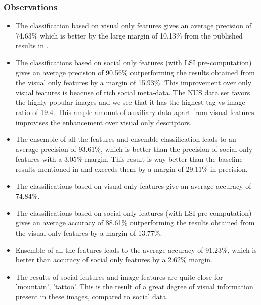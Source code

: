 \subsubsection*{Observations}
\begin{itemize}
\item The classification based on visual only features gives an  average precision of 74.63\% which is better by the large margin 
of 10.13\% from the published results in \citet*{NUS}.
\item The classifications based on social only features (with LSI pre-computation) gives an average precision of 90.56\% outperforming 
the results obtained from the visual only features by a  margin of 15.93\%. This improvement over only visual features is beacuse of rich social meta-data. The NUS data set favors the highly popular images and we see that it has the highest tag vs image ratio of 19.4. This ample amount of auxiliary data apart from visual features improvises the enhancement over visual only descriptors.
\item The ensemble of all the features and ensemble classification leads to an average precision of 93.61\%, which  is better than the precision of social only features with a 3.05\% margin. This result is way better than the baseline results mentioned in \citet*{NUS} and exceeds them by a margin of 29.11\% in precision.
\item The classifications based on visual only features give an average accuracy of 74.84\%.
\item The classifications based on social only features (with LSI pre-computation) gives an average accuracy of 88.61\% outperforming 
the results obtained from the visual only features by a margin of 13.77\%.
\item Ensemble of all the features leads to the average accuracy of 91.23\%, which is better than accuracy of social only features by a 2.62\% margin. 
\item The results of social features and image features are quite close for 'mountain', 'tattoo'. This is the result of a great degree 
of visual information present in these images, compared to social data.
\end{itemize}

